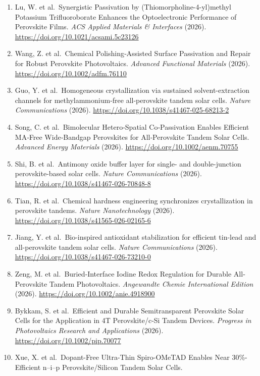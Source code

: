 \documentclass[
  11pt,
]{article}
\begin{document}
\begin{enumerate}
  \url{https://doi.org/10.1002/adma.73036}
\item
  Lu, W. et al.~Synergistic Passivation by (Thiomorpholine-4-yl)methyl
  Potassium Trifluoroborate Enhances the Optoelectronic Performance of
  Perovskite Films. \emph{ACS Applied Materials \& Interfaces} (2026).
  \url{https://doi.org/10.1021/acsami.5c23126}
\item
  Wang, Z. et al.~Chemical Polishing‐Assisted Surface Passivation and
  Repair for Robust Perovskite Photovoltaics. \emph{Advanced Functional
  Materials} (2026). \url{https://doi.org/10.1002/adfm.76110}
\item
  Guo, Y. et al.~Homogeneous crystallization via sustained
  solvent-extraction channels for methylammonium-free all-perovskite
  tandem solar cells. \emph{Nature Communications} (2026).
  \url{https://doi.org/10.1038/s41467-025-68213-2}
\item
  Song, C. et al.~Bimolecular Hetero‐Spatial Co‐Passivation Enables
  Efficient MA‐Free Wide‐Bandgap Perovskites for All‐Perovskite Tandem
  Solar Cells. \emph{Advanced Energy Materials} (2026).
  \url{https://doi.org/10.1002/aenm.70755}
\item
  Shi, B. et al.~Antimony oxide buffer layer for single- and
  double-junction perovskite-based solar cells. \emph{Nature
  Communications} (2026).
  \url{https://doi.org/10.1038/s41467-026-70848-8}
\item
  Tian, R. et al.~Chemical hardness engineering synchronizes
  crystallization in perovskite tandems. \emph{Nature Nanotechnology}
  (2026). \url{https://doi.org/10.1038/s41565-026-02165-6}
\item
  Jiang, Y. et al.~Bio-inspired antioxidant stabilization for efficient
  tin-lead and all-perovskite tandem solar cells. \emph{Nature
  Communications} (2026).
  \url{https://doi.org/10.1038/s41467-026-73210-0}
\item
  Zeng, M. et al.~Buried‐Interface Iodine Redox Regulation for Durable
  All‐Perovskite Tandem Photovoltaics. \emph{Angewandte Chemie
  International Edition} (2026).
  \url{https://doi.org/10.1002/anie.4918900}
\item
  Bykkam, S. et al.~Efficient and Durable Semitransparent Perovskite
  Solar Cells for the Application in 4T Perovskite/c‐Si Tandem Devices.
  \emph{Progress in Photovoltaics Research and Applications} (2026).
  \url{https://doi.org/10.1002/pip.70077}
\item
  Xue, X. et al.~Dopant-Free Ultra-Thin Spiro-OMeTAD Enables Near
  30\%-Efficient n--i--p Perovskite/Silicon Tandem Solar Cells.

\end{enumerate}
\end{document}

